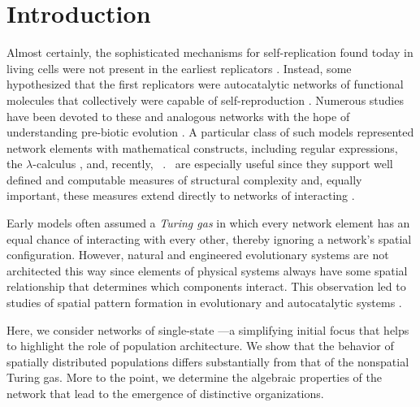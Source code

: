 \documentclass[pre,twocolumn,showpacs,superscriptaddress,preprintnumbers,floatfix]{revtex4}
\theoremstyle{plain}    \newtheorem{Lem}{Lemma}
\theoremstyle{plain}    \newtheorem*{ProLem}{Proof}
\theoremstyle{plain}    \newtheorem{Cor}{Corollary}
\theoremstyle{plain}    \newtheorem*{ProCor}{Proof}
\theoremstyle{plain}    \newtheorem{The}{Theorem}
\theoremstyle{plain}    \newtheorem*{ProThe}{Proof}
\theoremstyle{plain}    \newtheorem{Prop}{Proposition}
\theoremstyle{plain}    \newtheorem*{ProProp}{Proof}
\theoremstyle{plain}    \newtheorem*{Conj}{Conjecture}
\theoremstyle{plain}    \newtheorem*{Rem}{Remark}
\theoremstyle{plain}    \newtheorem{Def}{Definition}
\theoremstyle{plain}    \newtheorem*{Not}{Notation}
\begin{document}
\maketitle



%

\section{Introduction}

Almost certainly, the sophisticated mechanisms for self-replication found
today in living cells were not present in the earliest replicators
\cite{Szathmary87,Mayn95a,Gest99a}. Instead, some hypothesized that the first
replicators were autocatalytic networks of functional molecules that
collectively were capable of self-reproduction \cite{Eigen71,Eigen77}. Numerous
studies have been devoted to these and analogous networks with the hope of
understanding pre-biotic evolution \cite{Ray91a,Adami1,Rasmussen2}. A particular
class of such models represented network elements with mathematical constructs,
including regular expressions, the $\lambda$-calculus \cite{Font91a}, and,
recently, \eMs\ \cite{OTMOMerge}. \EMs\ are especially useful
since they support well defined and computable measures of structural complexity
\cite{Crut08b} and, equally important, these measures extend directly to
networks of interacting \eMs. 

Early models often assumed a \emph{Turing gas} in which every network element
has an equal chance of interacting with every other, thereby ignoring a
network's spatial configuration. However, natural and engineered evolutionary
systems are not architected this way since elements of physical systems always
have some spatial relationship that determines which components interact.
This observation led to studies of spatial pattern formation in evolutionary and
autocatalytic systems \cite{Kirn00a,Kirn02a,Acke06a}.

Here, we consider networks of single-state \eMs---a simplifying initial focus
that helps to highlight the role of population architecture. We show that the
behavior of spatially distributed populations differs substantially from that
of the nonspatial Turing gas. More to the point, we determine the algebraic
properties of the network that lead to the emergence of distinctive
organizations.
\end{document}

